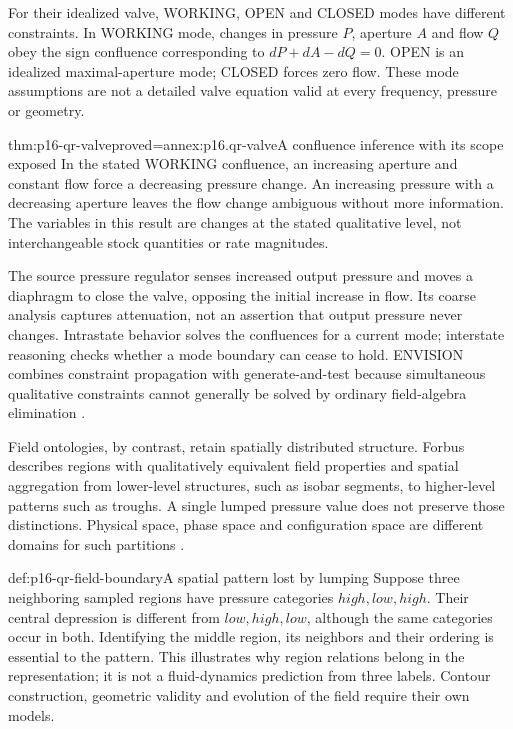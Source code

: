 For their idealized valve, WORKING, OPEN and CLOSED modes have different
constraints. In WORKING mode, changes in pressure \(P\), aperture \(A\)
and flow \(Q\) obey the sign confluence corresponding to
\(dP+dA-dQ=0\). OPEN is an idealized maximal-aperture mode; CLOSED
forces zero flow. These mode assumptions are not a detailed valve equation
valid at every frequency, pressure or geometry.

\begin{hbtheorem}{thm:p16-qr-valve}{proved=annex:p16.qr-valve}{A confluence inference with its scope exposed}
In the stated WORKING confluence, an increasing aperture and constant
flow force a decreasing pressure change. An increasing pressure with a
decreasing aperture leaves the flow change ambiguous without more information.
The variables in this result are changes at the stated qualitative level,
not interchangeable stock quantities or rate magnitudes.
\end{hbtheorem}

The source pressure regulator senses increased output pressure and moves a
diaphragm to close the valve, opposing the initial increase in flow.
Its coarse analysis captures attenuation, not an assertion that output
pressure never changes. Intrastate behavior solves the confluences for a
current mode; interstate reasoning checks whether a mode boundary can cease
to hold. ENVISION combines constraint propagation with generate-and-test
because simultaneous qualitative constraints cannot generally be solved by
ordinary field-algebra elimination \cite[secs.~4.1--4.2]{DeKleerBrown1984Confluences}.

Field ontologies, by contrast, retain spatially distributed structure.
Forbus describes regions with qualitatively equivalent field properties and
spatial aggregation from lower-level structures, such as isobar segments,
to higher-level patterns such as troughs. A single lumped pressure value
does not preserve those distinctions. Physical space, phase space and
configuration space are different domains for such partitions
\cite[sec.~9.3.3]{Forbus2008QualitativeModeling}.

\begin{hbexample}{def:p16-qr-field-boundary}{A spatial pattern lost by lumping}
Suppose three neighboring sampled regions have pressure categories
\(high,low,high\). Their central depression is different from
\(low,high,low\), although the same categories occur in both. Identifying
the middle region, its neighbors and their ordering is essential to the
pattern. This illustrates why region relations belong in the representation;
it is not a fluid-dynamics prediction from three labels. Contour construction,
geometric validity and evolution of the field require their own models.
\end{hbexample}


